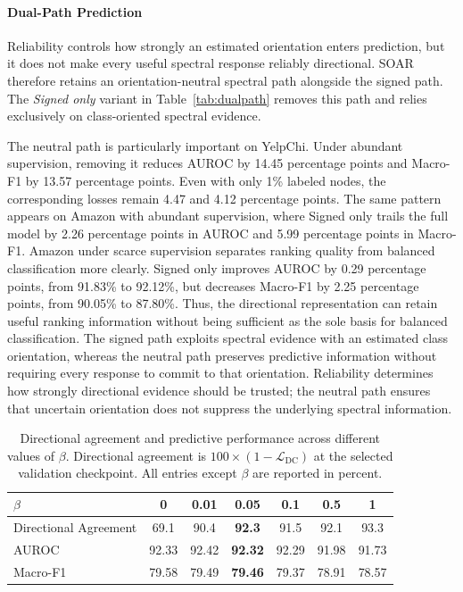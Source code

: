 \documentclass[10pt,journal]{IEEEtran}
\begin{document}
\paragraph{Dual-Path Prediction}
Reliability controls how strongly an estimated orientation enters prediction,
but it does not make every useful spectral response reliably directional.
SOAR therefore retains an orientation-neutral spectral path alongside the
signed path. The \emph{Signed only} variant in Table~\ref{tab:dualpath}
removes this path and relies exclusively on class-oriented spectral evidence.

The neutral path is particularly important on YelpChi. Under abundant
supervision, removing it reduces AUROC by 14.45 percentage points and
Macro-F1 by 13.57 percentage points. Even with only 1\% labeled nodes, the
corresponding losses remain 4.47 and 4.12 percentage points. The same pattern
appears on Amazon with abundant supervision, where Signed only trails the full
model by 2.26 percentage points in AUROC and 5.99 percentage points in
Macro-F1. Amazon under scarce supervision separates ranking quality from balanced
classification more clearly. Signed only improves AUROC by 0.29 percentage
points, from 91.83\% to 92.12\%, but decreases Macro-F1 by 2.25 percentage
points, from 90.05\% to 87.80\%. Thus, the directional representation can
retain useful ranking information without being sufficient as the sole basis
for balanced classification. The signed path exploits spectral evidence with
an estimated class orientation, whereas the neutral path preserves predictive
information without requiring every response to commit to that orientation.
Reliability determines how strongly directional evidence should be trusted;
the neutral path ensures that uncertain orientation does not suppress the
underlying spectral information.

\begin{table}[!h]
\centering
\caption{Directional agreement and predictive performance across different
values of $\beta$. Directional agreement is
$100\times(1-\mathcal{L}_{\mathrm{DC}})$ at the selected validation
checkpoint. All entries except $\beta$ are reported in percent.}
\label{tab:dc}
\scriptsize
\setlength{\tabcolsep}{4.8pt}
\renewcommand{\arraystretch}{1.10}

\begin{tabular}{lcccccc}
\toprule
$\beta$
& 0
& 0.01
& \cellcolor{abfull}\textbf{0.05}
& 0.1
& 0.5
& 1 \\
\midrule
Directional Agreement
& 69.1
& 90.4
& \cellcolor{abfull}\textbf{92.3}
& 91.5
& 92.1
& 93.3 \\
AUROC
& 92.33
& 92.42
& \cellcolor{abfull}\textbf{92.32}
& 92.29
& 91.98
& 91.73 \\
Macro-F1
& 79.58
& 79.49
& \cellcolor{abfull}\textbf{79.46}
& 79.37
& 78.91
& 78.57 \\
\bottomrule
\end{tabular}
\end{table}
\end{document}
